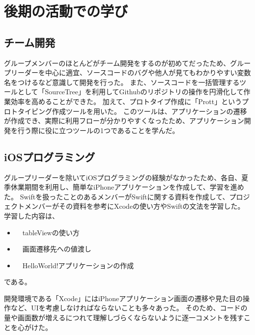 \documentclass[openany,11pt,papersize]{jsbook}
\begin{document}

\section{後期の活動での学び}
\subsection{チーム開発}
グループメンバーのほとんどがチーム開発をするのが初めてだったため、グループリーダーを中心に適宜、ソースコードのバグや他人が見てもわかりやすい変数名をつけるなど意識して開発を行った。
また、ソースコードを一括管理するツールとして「SourceTree」を利用してGithubのリポジトリの操作を円滑化して作業効率を高めることができた。
加えて、プロトタイプ作成に「Prott」というプロトタイピング作成ツールを用いた。
このツールは、アプリケーションの遷移が作成でき、実際に利用フローが分かりやすくなったため、アプリケーション開発を行う際に役に立つツールの1つであることを学んだ。


\subsection{iOSプログラミング}
グループリーダーを除いてiOSプログラミングの経験がなかったため、各自、夏季休業期間を利用し、簡単なiPhoneアプリケーションを作成して、学習を進めた。
Swiftを扱ったことのあるメンバーがSwiftに関する資料を作成して、プロジェクトメンバーがその資料を参考にXcodeの使い方やSwiftの文法を学習した。
学習した内容は、
\begin{itemize}

\item　tableViewの使い方
\item　画面遷移先への値渡し
\item　HelloWorld!アプリケーションの作成

\end{itemize}
である。

開発環境である「Xcode」にはiPhoneアプリケーション画面の遷移や見た目の操作など、UIを考慮しなければならないことも多々あった。
そのため、コードの量や画面数が増えるにつれて理解しづらくならないように逐一コメントを残すことを心がけた。

\end{document}
